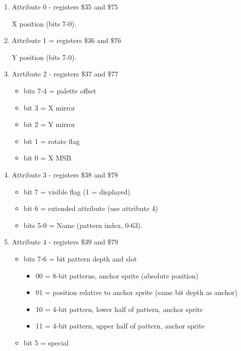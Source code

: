 \begin{enumerate}
\item Attribute 0 - registers \$35 and \$75

  X position (bits 7-0).
\item Attribute 1 = registers \$36 and \$76

  Y position (bits 7-0).
\item Arrtibute 2 - registers \$37 and \$77
  \begin{itemize}
  \item bits 7-4 = palette offset
  \item bit 3 = X mirror
  \item bit 2 = Y mirror
  \item bit 1 = rotate flag
  \item bit 0 = X MSB.
  \end{itemize}
\item Attribute 3 - registers \$38 and \$78
  \begin{itemize}
  \item bit 7 = visible flag (1 = displayed)
  \item bit 6 = extended attribute (use attribute 4)
  \item bits 5-0 = Name (pattern index, 0-63).
  \end{itemize}
\item Attribute 4 - registers \$39 and \$79
  \begin{itemize}
  \item bits 7-6 = bit pattern depth and slot
    \begin{itemize}
    \item 00 = 8-bit patterns, anchor sprite (absolute position)
    \item 01 = position relative to anchor sprite (same bit depth as anchor)
    \item 10 = 4-bit pattern, lower half of pattern, anchor sprite
    \item 11 = 4-bit pattern, upper half of pattern, anchor sprite
    \end{itemize}
  \item bit 5 = special
  

\end{itemize}
\end{enumerate}
